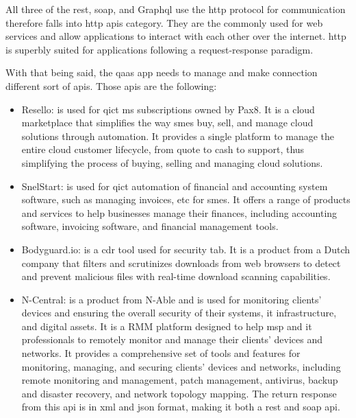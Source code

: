 \begin{multicols}{2}
      All three of the \acrshort{rest}, \acrshort{soap}, and Graph\acrshort{ql} use the \acrshort{http} protocol for
      communication therefore falls into \acrshort{http} \acrshort{api}s category. They are the commonly used for web
      services  and allow applications to interact with each other over the internet. \acrshort{http} is superbly
      suited for applications following a request-response paradigm.
\end{multicols}

\begin{multicols}{2}
      With that being said, the \acrshort{qaas} app needs to manage and make connection different sort of \acrshort{api}s.
      Those \acrshort{api}s are the following:
      \begin{itemize}
            \item Resello: is used for \acrshort{qict} \acrshort{ms} subscriptions owned by Pax8. It is a cloud
                  marketplace that simplifies the way \acrshort{sme}s buy, sell, and manage cloud solutions through
                  automation. It provides a single platform to manage the entire cloud customer lifecycle, from
                  quote to cash to support, thus simplifying the process of buying, selling and managing cloud
                  solutions.
            \item SnelStart: is used for \acrshort{qict} automation of financial and accounting system software,
                  such as managing invoices, \acrshort{etc} for \acrshort{sme}s. It offers a range of products and
                  services to help businesses manage their finances, including accounting software, invoicing software,
                  and financial management tools.
            \item Bodyguard.io: is a \acrshort{cdr} tool used for security tab. It is a product from a Dutch company
                  that filters and scrutinizes downloads from web browsers to detect and prevent malicious files with
                  real-time download scanning capabilities.
            \item N-Central: is a product from N-Able and is used for monitoring clients' devices and ensuring the
                  overall security of their systems, \acrshort{it} infrastructure, and digital assets. It is a
                  \gls{RMM} platform designed to help \acrshort{msp} and \acrshort{it} professionals to
                  remotely monitor and manage their clients' devices and networks. It provides a comprehensive
                  set of tools and features for monitoring, managing, and securing clients' devices and networks,
                  including remote monitoring and management, patch management, antivirus, backup and disaster
                  recovery, and network topology mapping. The return response from this \acrshort{api} is in \acrshort{xml}
                  and \acrshort{json} format, making it both a \acrshort{rest} and \acrshort{soap} \acrshort{api}.
      \end{itemize}

\end{multicols}

